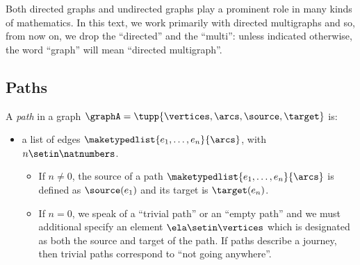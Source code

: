 {%

Both directed graphs and undirected graphs play a prominent role in many kinds of mathematics.
In this text, we work primarily with directed multigraphs and so, from now on, we drop the ``directed'' and the ``multi'': unless indicated otherwise, the word ``graph'' will mean ``directed multigraph''.



\subsection{Paths}

\begin{ctdefinition}[Paths]
    \label{def:path}
    A \emph{path} in a graph $\graphA=\tupp{\vertices,\arcs, \source,\target}$ is:

    \constit

    \begin{itemize}
        \item a list of edges $\maketypedlist{e_1, \dots, e_n}{\arcs}$, with $n \setin \natnumbers$.
              \begin{itemize}
                  \item If $n \neq 0$, the source of a path $\maketypedlist{e_1, \dots, e_n}{\arcs}$ is defined as $\source(e_1)$ and its target is $\target(e_n)$.
                  \item If $n = 0$, we speak of a ``trivial path'' or an ``empty path'' and we must additional specify an element $\ela \setin \vertices$ which is designated as both the source and target of the path.
                        If paths describe a journey, then trivial paths correspond to ``not going anywhere''.
              \end{itemize}
    \end{itemize}


\end{ctdefinition}}
